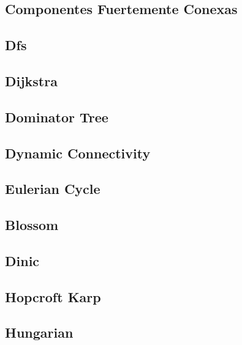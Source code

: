 \documentclass[10pt,landscape,twocolumn,a4paper,notitlepage]{article}
\newcommand\cppfile[2][]{

}
\begin{document}
\subsection{Componentes Fuertemente Conexas}
\cppfile{grafos/componentes_fuertemente_conexas.cpp}

\subsection{Dfs}
\cppfile{grafos/dfs.cpp}

\subsection{Dijkstra}
\cppfile{grafos/dijkstra.cpp}

\subsection{Dominator Tree}
\cppfile{grafos/dominator_Tree.cpp}

\subsection{Dynamic Connectivity}
\cppfile{grafos/dynamic_Connectivity.cpp}

\subsection{Eulerian Cycle}
\cppfile{grafos/eulerian_cycle.cpp}

\subsection{Blossom}
\cppfile{grafos/flow/blossom.cpp}

\subsection{Dinic}
\cppfile{grafos/flow/dinic.cpp}

\subsection{Hopcroft Karp}
\cppfile{grafos/flow/hopcroft_karp.cpp}

\subsection{Hungarian}
\cppfile{grafos/flow/hungarian.cpp}
\end{document}

